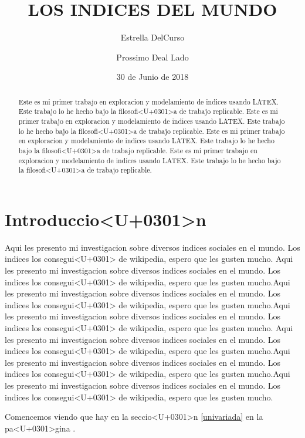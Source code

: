 \documentclass{article}
\title{LOS INDICES DEL MUNDO}
\author[1]{\normalsize Estrella DelCurso}
\author[2]{\normalsize Prossimo Deal Lado}
\affil[1,2]{\small  Escuela de Ingenieri<U+0301>a,Universidad de los Andes\\
\texttt{{delcurso,deallado}@uniandes.edu.col}}
\affil[1]{\small Instituto de altas investigaciones financieras\\
Banco del Parque\\
\texttt{delcurso@bp.com.col}}
\date{30 de Junio de 2018}
\begin{document}


\maketitle


\begin{abstract}
Este es mi primer trabajo en exploracion y modelamiento de indices usando LATEX. Este trabajo lo he hecho bajo la filosofi<U+0301>a de trabajo replicable. Este es mi primer trabajo en exploracion y modelamiento de indices usando LATEX. Este trabajo lo he hecho bajo la filosofi<U+0301>a de trabajo replicable. Este es mi primer trabajo en exploracion y modelamiento de indices usando LATEX. Este trabajo lo he hecho bajo la filosofi<U+0301>a de trabajo replicable. Este es mi primer trabajo en exploracion y modelamiento de indices usando LATEX. Este trabajo lo he hecho bajo la filosofi<U+0301>a de trabajo replicable.
\end{abstract}

\section*{Introduccio<U+0301>n}

Aqui les presento mi investigacion sobre diversos indices sociales en el mundo. Los indices los consegui<U+0301> de wikipedia, espero que les gusten mucho. Aqui les presento mi investigacion sobre diversos indices sociales en el mundo. Los indices los consegui<U+0301> de wikipedia, espero que les gusten mucho.Aqui les presento mi investigacion sobre diversos indices sociales en el mundo. Los indices los consegui<U+0301> de wikipedia, espero que les gusten mucho.Aqui les presento mi investigacion sobre diversos indices sociales en el mundo. Los indices los consegui<U+0301> de wikipedia, espero que les gusten mucho.
Aqui les presento mi investigacion sobre diversos indices sociales en el mundo. Los indices los consegui<U+0301> de wikipedia, espero que les gusten mucho.Aqui les presento mi investigacion sobre diversos indices sociales en el mundo. Los indices los consegui<U+0301> de wikipedia, espero que les gusten mucho.Aqui les presento mi investigacion sobre diversos indices sociales en el mundo. Los indices los consegui<U+0301> de wikipedia, espero que les gusten mucho.

Comencemos viendo que hay en la seccio<U+0301>n \ref{univariada} en la pa<U+0301>gina \pageref{univariada}.

\clearpage








\renewcommand{\refname}{Bibliography}

\end{document}
